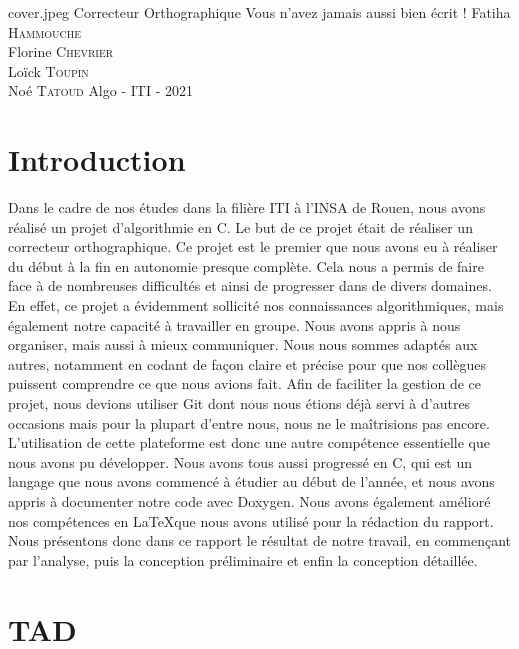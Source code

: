 \documentclass{article}
\begin{document}
\PageDeGarde	
{cover.jpeg} %
{Correcteur Orthographique} %
{Vous n'avez jamais aussi bien écrit !} %
{Fatiha \textsc{Hammouche} \\
Florine \textsc{Chevrier} \\
Loïck \textsc{Toupin} \\
Noé \textsc{Tatoud}}
{Algo - ITI - 2021} %


\tableofcontents

\clearpage
\section{Introduction}
Dans le cadre de nos études dans la filière ITI à l’INSA de Rouen, nous avons réalisé un projet d’algorithmie en C. Le but de ce projet était de réaliser un correcteur orthographique. Ce projet est le premier que nous avons eu à réaliser du début à la fin en autonomie presque complète. Cela nous a permis de faire face à de nombreuses difficultés et ainsi de progresser dans de divers domaines.
\newline
En effet, ce projet a évidemment sollicité nos connaissances algorithmiques, mais également notre capacité à travailler en groupe. Nous avons appris à nous organiser, mais aussi à mieux communiquer. Nous nous sommes adaptés aux autres, notamment en codant de façon claire et précise pour que nos collègues puissent comprendre ce que nous avions fait. Afin de faciliter la gestion de ce projet, nous devions utiliser Git dont nous nous étions déjà servi à d’autres occasions mais pour la plupart d’entre nous, nous ne le maîtrisions pas encore. L’utilisation de cette plateforme est donc une autre compétence essentielle que nous avons pu développer. Nous avons tous aussi progressé en C, qui est un langage que nous avons commencé à étudier au début de l’année, et nous avons appris à documenter notre code avec Doxygen. Nous avons également amélioré nos compétences en \LaTeX que nous avons utilisé pour la rédaction du rapport.
\newline
Nous présentons donc dans ce rapport le résultat de notre travail, en commençant par l’analyse, puis la conception préliminaire et enfin la conception détaillée.
\clearpage
\section{TAD}
	
	\clearpage
	
	\clearpage
	
	\clearpage
	
\end{document}
